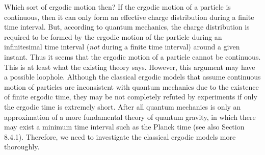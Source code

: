 
Which sort of ergodic motion then?  If the ergodic motion of a particle is continuous, then it can only form an effective charge distribution during a finite time interval. But, according to quantum mechanics, the charge distribution is required to be formed by the ergodic motion of the particle during an infinitesimal time interval (\emph{not} during a finite time interval) around a given instant. Thus it seems that the ergodic motion of a particle cannot be continuous.
This is at least what the existing theory says. However, this argument may have a possible loophole. Although the classical ergodic models that assume continuous motion of particles are inconsistent with quantum mechanics due to the existence of finite ergodic time, they may be not completely refuted by experiments if only the ergodic time is extremely short. After all quantum mechanics is only an approximation of a more fundamental theory of quantum gravity, in which there may exist a minimum time interval such as the Planck time (see also Section 8.4.1). Therefore, we need to investigate the classical ergodic models more thoroughly.

